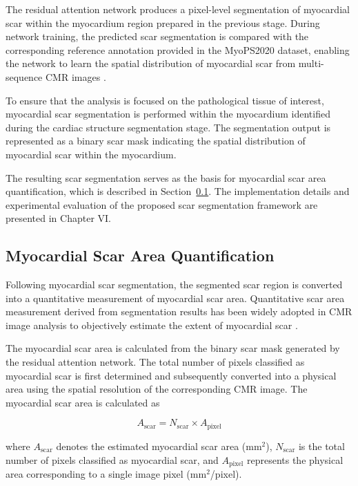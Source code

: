 The residual attention network produces a pixel-level segmentation of myocardial scar within the myocardium region prepared in the previous stage. During network training, the predicted scar segmentation is compared with the corresponding reference annotation provided in the MyoPS2020 dataset, enabling the network to learn the spatial distribution of myocardial scar from multi-sequence CMR images \citep{Zhuang2020}.

To ensure that the analysis is focused on the pathological tissue of interest, myocardial scar segmentation is performed within the myocardium identified during the cardiac structure segmentation stage. The segmentation output is represented as a binary scar mask indicating the spatial distribution of myocardial scar within the myocardium.

The resulting scar segmentation serves as the basis for myocardial scar area quantification, which is described in Section~\ref{subsec:scar-area}. The implementation details and experimental evaluation of the proposed scar segmentation framework are presented in Chapter VI.

\subsection{Myocardial Scar Area Quantification}
\label{subsec:scar-area}

Following myocardial scar segmentation, the segmented scar region is converted into a quantitative measurement of myocardial scar area. Quantitative scar area measurement derived from segmentation results has been widely adopted in CMR image analysis to objectively estimate the extent of myocardial scar \citep{Karim2016,Zhuang2020}.

The myocardial scar area is calculated from the binary scar mask generated by the residual attention network. The total number of pixels classified as myocardial scar is first determined and subsequently converted into a physical area using the spatial resolution of the corresponding CMR image. The myocardial scar area is calculated as

\begin{equation}
A_{\mathrm{scar}} = N_{\mathrm{scar}} \times A_{\mathrm{pixel}}
\label{eq:scar-area}
\end{equation}

where $A_{\mathrm{scar}}$ denotes the estimated myocardial scar area (mm$^2$), $N_{\mathrm{scar}}$ is the total number of pixels classified as myocardial scar, and $A_{\mathrm{pixel}}$ represents the physical area corresponding to a single image pixel (mm$^2$/pixel).

